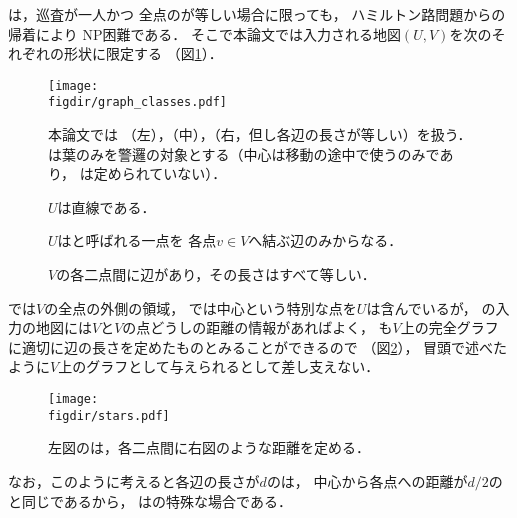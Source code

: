 {\PP}は，巡査が一人かつ
全点の{\maxIdletime}が等しい場合に限っても，
ハミルトン路問題からの帰着により
NP困難である\cite[Theorem~8]{coene2011charlemagne}．
そこで本論文では入力される地図$(U, V)$を次のそれぞれの形状に限定する
（図\ref{figure: graph_classes}）．
%
\begin{figure}
  \centering
  \texttt{[image: \\figdir/graph\_classes.pdf]}
  \caption{本論文では
    {\graphLine}（左），{\graphStar}（中），{\graphUnit}（右，但し各辺の長さが等しい）を扱う．
    {\graphStar}は葉のみを警邏の対象とする（中心は移動の途中で使うのみであり，
    {\maxIdletime}は定められていない）．}
  \label{figure: graph_classes}
\end{figure}
%
\begin{description}
  \item[{\graphLine}]
    $U$は直線である．
  \item[{\graphStar}]
    $U$はと呼ばれる一点を
    各点$v \in V$へ結ぶ辺のみからなる．
  \item[{\graphUnit}]
    $V$の各二点間に辺があり，その長さはすべて等しい．
\end{description}
%
{\graphLine}では$V$の全点の外側の領域，
{\graphStar}では中心という特別な点を$U$は含んでいるが，
{\PPProfit}の入力の地図には$V$と$V$の点どうしの距離の情報があればよく，
{\graphStar}も$V$上の完全グラフに適切に辺の長さを定めたものとみることができるので
（図\ref{figure: stars}），
冒頭で述べたように$V$上のグラフとして与えられるとして差し支えない．
\begin{figure}
  \centering
  \texttt{[image: \\figdir/stars.pdf]}
  \caption{左図の{\graphStar}は，各二点間に右図のような距離を定める．}
  \label{figure: stars}
\end{figure}
なお，このように考えると各辺の長さが$d$の{\graphUnit}は，
中心から各点への距離が$d/2$の{\graphStar}と同じであるから，
{\graphUnit}は{\graphStar}の特殊な場合である．

